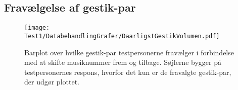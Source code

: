 \subsection{Fravælgelse af gestik-par}
\label{TestresultaterVolumenDaarlig}
%



%
\begin{figure}[H]
	\centering
	\texttt{[image: Test1/DatabehandlingGrafer/DaarligstGestikVolumen.pdf]}
	\caption{Barplot over hvilke gestik-par testpersonerne fravælger i forbindelse med at skifte musiknummer frem og tilbage. Søjlerne bygger på testpersonernes respons, hvorfor det kun er de fravalgte gestik-par, der udgør plottet.}
	\label{fig:DaarligstGestikVolumen}
\end{figure}
\noindent
%